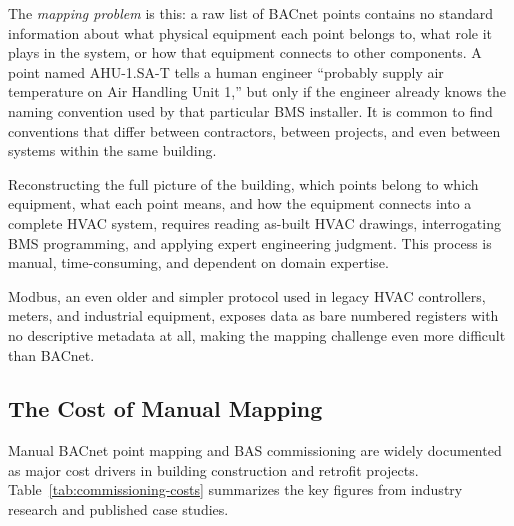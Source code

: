 The \emph{mapping problem} is this: a raw list of BACnet points contains no standard information about
what physical equipment each point belongs to, what role it plays in the system, or how that equipment
connects to other components.
A point named AHU-1.SA-T tells a human engineer ``probably supply air temperature on
Air Handling Unit 1,'' but only if the engineer already knows the naming convention used by that
particular BMS installer.
It is common to find conventions that differ between contractors, between projects, and even between
systems within the same building.

Reconstructing the full picture of the building, which points belong to which equipment, what each
point means, and how the equipment connects into a complete HVAC system, requires reading as-built
HVAC drawings, interrogating BMS programming, and applying expert engineering judgment.
This process is manual, time-consuming, and dependent on domain expertise.

Modbus, an even older and simpler protocol used in legacy HVAC controllers, meters, and industrial
equipment, exposes data as bare numbered registers with no descriptive metadata at all, making the
mapping challenge even more difficult than BACnet.

\subsection{The Cost of Manual Mapping}
\label{subsec:cost}

Manual BACnet point mapping and BAS commissioning are widely documented as major cost drivers in
building construction and retrofit projects.
Table~\ref{tab:commissioning-costs} summarizes the key figures from industry research and published
case studies.


